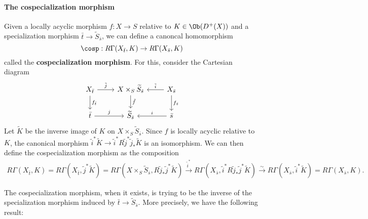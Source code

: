 \paragraph{The cospecialization morphism}
Given a locally acyclic morphism $f:X\to S$ relative to $K\in\Ob(D^+(X))$ and a specialization morphism $\bar{t}\to\widetilde{S}_{\bar{s}}$, we can define a canoncal homomorphism
\[\cosp:R\Gamma(X_{\bar{t}},K)\to R\Gamma(X_{\bar{s}},K)\]
called the \textbf{cospecialization morphism}. For this, consider the Cartesian diagram
\[\begin{tikzcd}
X_{\bar{t}}\ar[r,"\tilde{j}"]\ar[d,"f_{\bar{t}}"]&X\times_S\widetilde{S}_{\bar{s}}\ar[d,"\tilde{f}"]&X_{\bar{s}}\ar[d,"f_{\bar{s}}"]\ar[l,swap,"\tilde{i}"]\\
\bar{t}\ar[r,"j"]&\widetilde{S}_{\bar{s}}&\bar{s}\ar[l,swap,"i"]
\end{tikzcd}\]
Let $\widetilde{K}$ be the inverse image of $K$ on $X\times_S\widetilde{S}_{\bar{s}}$. Since $f$ is locally acyclic relative to $K$, the canonical morphism $\tilde{i}^*\widetilde{K}\to\tilde{i}^*R\tilde{j}^*\tilde{j}_*\widetilde{K}$ is an isomorphism. We can then define the cospecialization morphism as the composition
\begin{align*}
R\Gamma(X_{\bar{t}},K)=R\Gamma(X_{\bar{t}},\tilde{j}^*\widetilde{K})=R\Gamma(X\times_S\widetilde{S}_{\bar{s}},R\tilde{j}_*\tilde{j}^*\widetilde{K})\stackrel{\tilde{i}^*}{\to}R\Gamma(X_{\bar{s}},\tilde{i}^*R\tilde{j}_*\tilde{j}^*\widetilde{K})\stackrel{\sim}{\to}R\Gamma(X_{\bar{s}},\tilde{i}^*\widetilde{K})=R\Gamma(X_{\bar{s}},K).
\end{align*}

The cospecialization morphism, when it exists, is trying to be the inverse of the specialization morphism induced by $\bar{t}\to\widetilde{S}_{\bar{s}}$. More precisely, we have the following result:

